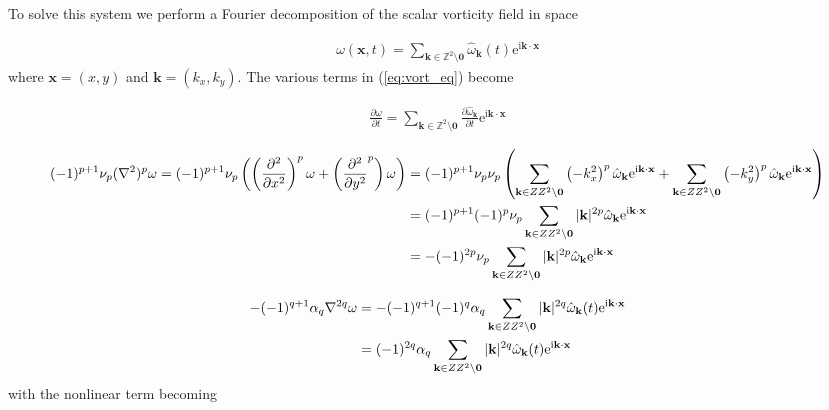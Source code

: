 \documentclass[9pt]{article}
\newcommand{\pder}[2]{\frac{\partial #1}{\partial #2}}               %
\newcommand{\ppder}[2]{\frac{\partial^2 #1}{\partial {#2}^2}}        %
\newcommand{\ii}{\mathrm{i}}      								  %
\newcommand{\e}{\mathrm{e}}      								  %
\newcommand{\omegahat}[1]{\hat{\omega}_{ \mathbf{#1} } }								%
\newcommand{\bfx}{\mathbf{x}}								%
\newcommand{\bfk}{\mathbf{k}}								%
\begin{document}
To solve this system we perform a Fourier decomposition of the scalar vorticity field in space

\begin{align}
	\omega(\mathbf{x}, t) = \sum_{\mathbf{k}\in \mathbb{Z}^2\setminus \mathbf{0}}\hat{\omega}_{\mathbf{k}}(t)\e^{\ii \mathbf{k}\cdot \mathbf{x}}
	\label{eq:fourier_decomp}
\end{align}
where $\bfx = (x, y)$ and $\bfk = (k_x, k_y)$. The various terms in (\ref{eq:vort_eq}) become

\begin{align}
	\pder{\omega}{t} = \sum_{\bfk \in \mathbb{Z}^2\setminus \mathbf{0}} \pder{\omegahat{k}}{t} \e^{\ii \mathbf{k}\cdot \mathbf{x}}
\end{align}


\begin{align}
	(-1)^{p + 1}\nu_p (\nabla^2)^p  \omega =  (-1)^{p + 1}\nu_p \left(\left(\ppder{}{x}\right)^p\omega + \left(\ppder{}{y}^p\right)\omega\right) &= (-1)^{p + 1}\nu_p \nu_p\left(\sum_{\mathbf{k}\in \mathbb{Z}^2\setminus \mathbf{0}} \left(-k_x^2\right)^p\hat{\omega}_{\mathbf{k}}\e^{\ii \mathbf{k}\cdot \mathbf{x}} +\sum_{\mathbf{k}\in \mathbb{Z}^2\setminus \mathbf{0}} \left(-k_y^2\right)^p\hat{\omega}_{\mathbf{k}}\e^{\ii \mathbf{k}\cdot \mathbf{x}} \right)\notag \\
	&= (-1)^{p + 1}(-1)^p\nu_p\sum_{\mathbf{k}\in \mathbb{Z}^2\setminus \mathbf{0}} |\bfk|^{2p}\hat{\omega}_{\mathbf{k}}\e^{\ii \mathbf{k}\cdot \mathbf{x}} \notag\\
	&= -(-1)^{2p}\nu_p\sum_{\mathbf{k}\in \mathbb{Z}^2\setminus \mathbf{0}} |\bfk|^{2p}\hat{\omega}_{\mathbf{k}}\e^{\ii \mathbf{k}\cdot \mathbf{x}} 
\end{align}

\begin{align}
	-(-1)^{q + 1}\alpha_q \nabla^{2q}\omega &= -(-1)^{q + 1} (-1)^{q}\alpha_q \sum_{\mathbf{k}\in \mathbb{Z}^2\setminus \mathbf{0}} |\bfk|^{2q}\hat{\omega}_{\mathbf{k}}(t)\e^{\ii \mathbf{k}\cdot \mathbf{x}} \notag \\
																					&= (-1)^{2q}\alpha_q \sum_{\mathbf{k}\in \mathbb{Z}^2\setminus \mathbf{0}} |\bfk|^{2q}\hat{\omega}_{\mathbf{k}}(t)\e^{\ii \mathbf{k}\cdot \mathbf{x}}
\end{align}
with the nonlinear term becoming 
\end{document}
